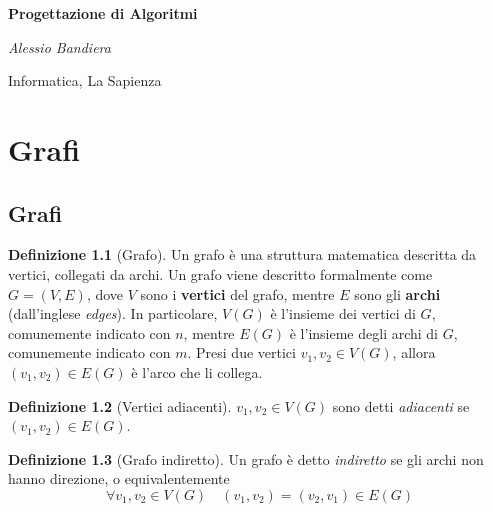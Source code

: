 \documentclass[14pt]{extreport}
\theoremstyle{definition}
\newtheorem{definition}{Definizione}[section]
\theoremstyle{remark}
\begin{document}
\begin{titlepage}
    \centering
    \vspace*{1cm}

    \textbf{\huge Progettazione di Algoritmi}

    \vspace{1.5cm}

    \textit{\Large Alessio Bandiera}

    \vfill
        
    \large Informatica, La Sapienza
\end{titlepage}

\tableofcontents

\pagebreak


\chapter{Grafi}

\section{Grafi}

\begin{definition}[Grafo]
    Un grafo è una struttura matematica descritta da vertici, collegati da archi. Un grafo viene descritto formalmente come $G=(V, E)$, dove $V$ sono i \textbf{vertici} del grafo, mentre $E$ sono gli \textbf{archi} (dall'inglese \textit{edges}). In particolare, $V(G)$ è l'insieme dei vertici di $G$, comunemente indicato con $n$, mentre $E(G)$ è l'insieme degli archi di $G$, comunemente indicato con $m$. Presi due vertici $v_1,v_2 \in V(G)$, allora $(v_1, v_2) \in E(G)$ è l'arco che li collega.
\end{definition}

\begin{definition}[Vertici adiacenti]
    $v_1, v_2 \in V(G)$ sono detti \textit{adiacenti} se $(v_1, v_2) \in E(G)$.
\end{definition}

\begin{definition}[Grafo indiretto]
    Un grafo è detto \textit{indiretto} se gli archi non hanno direzione, o equivalentemente $$\forall v_1, v_2 \in V(G) \quad (v_1, v_2) = (v_2, v_1) \in E(G)$$
\end{definition}
\end{document}

